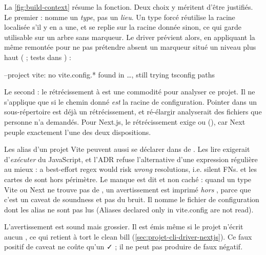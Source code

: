 La \cref{fig:build-context} résume la fonction. Deux choix y méritent d'être justifiés. Le premier :  nomme un \emph{type}, pas un \emph{lieu}. Un type forcé réutilise la racine localisée s'il y en a une, et se replie sur la racine donnée sinon, ce qui garde  utilisable sur un arbre sans marqueur. Le driver prévient alors, en appliquant la même remontée pour ne pas prétendre absent un marqueur situé un niveau plus haut ( ; tests  dans ) :
\begin{sortie}
[warn] --project vite: no vite.config.* found in …, still trying tsconfig paths
\end{sortie}
Le second : le rétrécissement à  est une commodité pour \og analyser ce projet\fg{}. Il ne s'applique que si le chemin donné \emph{est} la racine de configuration. Pointer dans un sous-répertoire est déjà un rétrécissement, et ré-élargir analyserait des fichiers que personne n'a demandés. Pour Next.js, le rétrécissement exige  ou  (), car Next peuple exactement l'une des deux dispositions.

\begin{decision}
Les alias d'un projet Vite peuvent aussi se déclarer dans  de . Les lire exigerait d'\emph{exécuter} du JavaScript, et l'ADR refuse l'alternative d'une expression régulière \og au mieux\fg{} : \og a best-effort regex would risk \emph{wrong} resolutions, i.e. silent FNs\fg{}.  et les cartes  de  sont hors périmètre. Le manque est dit et non caché : quand un type Vite ou Next ne trouve pas de , un avertissement est imprimé \emph{hors} , parce que c'est un caveat de soundness et pas du bruit. Il nomme le fichier de configuration dont les alias ne sont pas lus (\og Aliases declared only in vite.config are not read\fg{}).
\end{decision}

\begin{remarque}
L'avertissement est sound mais grossier. Il est émis même si le projet n'écrit aucun , ce qui retient à tort le clean bill (\cref{sec:projet-cli-driver-nextjs}). Ce faux positif de caveat ne coûte qu'un \og ✓\fg{} ; il ne peut pas produire de faux négatif.
\end{remarque}

